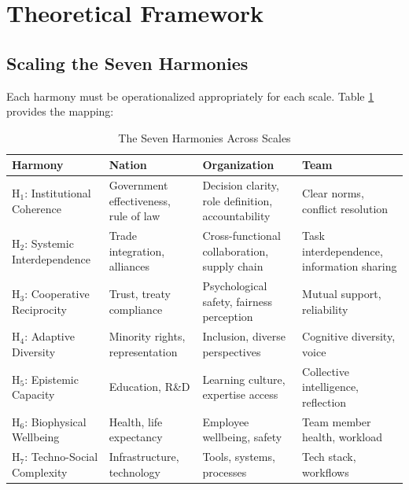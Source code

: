 \documentclass[12pt,a4paper]{article}
\begin{document}
\section{Theoretical Framework}
\label{sec:theory}

\subsection{Scaling the Seven Harmonies}

Each harmony must be operationalized appropriately for each scale. Table \ref{tab:harmonies_scaled} provides the mapping:

\begin{table}[H]
\centering
\caption{The Seven Harmonies Across Scales}
\label{tab:harmonies_scaled}
\small
\begin{tabular}{p{2.5cm}p{3cm}p{3cm}p{3cm}}
\toprule
\textbf{Harmony} & \textbf{Nation} & \textbf{Organization} & \textbf{Team} \\
\midrule
H$_1$: Institutional Coherence & Government effectiveness, rule of law & Decision clarity, role definition, accountability & Clear norms, conflict resolution \\
\midrule
H$_2$: Systemic Interdependence & Trade integration, alliances & Cross-functional collaboration, supply chain & Task interdependence, information sharing \\
\midrule
H$_3$: Cooperative Reciprocity & Trust, treaty compliance & Psychological safety, fairness perception & Mutual support, reliability \\
\midrule
H$_4$: Adaptive Diversity & Minority rights, representation & Inclusion, diverse perspectives & Cognitive diversity, voice \\
\midrule
H$_5$: Epistemic Capacity & Education, R\&D & Learning culture, expertise access & Collective intelligence, reflection \\
\midrule
H$_6$: Biophysical Wellbeing & Health, life expectancy & Employee wellbeing, safety & Team member health, workload \\
\midrule
H$_7$: Techno-Social Complexity & Infrastructure, technology & Tools, systems, processes & Tech stack, workflows \\
\bottomrule
\end{tabular}
\end{table}
\end{document}

